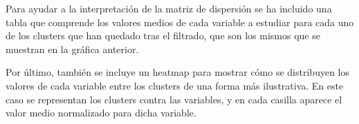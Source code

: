 	Para ayudar a la interpretación de la matriz de dispersión se ha incluido una tabla que comprende los valores medios de cada variable a estudiar para cada uno de los clusters que han quedado tras el filtrado, que son los mismos que se muestran en la gráfica anterior.

	\begin{table}[H]
		\centering
		\caption{Tabla de valores medios del algoritmo K-Means para el primer caso de estudio.}
	\end{table}
	
	Por último, también se incluye un heatmap para mostrar cómo se distribuyen los valores de cada variable entre los clusters de una forma más ilustrativa. En este caso se representan los clusters contra las variables, y en cada casilla aparece el valor medio normalizado para dicha variable.
	
